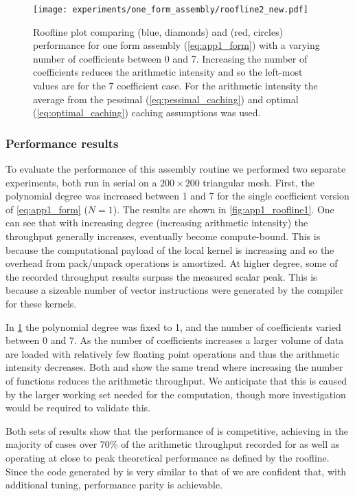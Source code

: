 \documentclass[thesis]{subfiles}
\begin{document}
\begin{figure}
  \centering
  \texttt{[image: experiments/one\_form\_assembly/roofline2\_new.pdf]}
  \caption{
    Roofline plot comparing  (blue, diamonds) and  (red, circles) performance for one form assembly (\cref{eq:app1_form}) with a varying number of coefficients between 0 and 7.
    Increasing the number of coefficients reduces the arithmetic intensity and so the left-most values are for the 7 coefficient case.
    For the arithmetic intensity the average from the pessimal (\cref{eq:pessimal_caching}) and optimal (\cref{eq:optimal_caching}) caching assumptions was used.
  }
  \label{fig:app1_roofline2}
\end{figure}

\subsubsection{Performance results}

To evaluate the performance of this assembly routine we performed two separate experiments, both run in serial on a $200\times 200$ triangular mesh.
First, the polynomial degree was increased between 1 and 7 for the single coefficient version of \cref{eq:app1_form} ($N=1$).
The results are shown in \cref{fig:app1_roofline1}.
One can see that with increasing degree (increasing arithmetic intensity) the throughput generally increases, eventually become compute-bound.
This is because the computational payload of the local kernel is increasing and so the overhead from pack/unpack operations is amortized.
At higher degree, some of the recorded throughput results surpass the measured scalar peak.
This is because a sizeable number of vector instructions were generated by the compiler for these kernels.

In \cref{fig:app1_roofline2} the polynomial degree was fixed to 1, and the number of coefficients varied between 0 and 7.
As the number of coefficients increases a larger volume of data are loaded with relatively few floating point operations and thus the arithmetic intensity decreases.
Both  and  show the same trend where increasing the number of functions reduces the arithmetic throughput.
We anticipate that this is caused by the larger working set needed for the computation, though more investigation would be required to validate this.

Both sets of results show that the performance of  is competitive, achieving in the majority of cases over 70\% of the arithmetic throughput recorded for  as well as operating at close to peak theoretical performance as defined by the roofline.
Since the code generated by  is very similar to that of  we are confident that, with additional tuning, performance parity is achievable.
\end{document}
